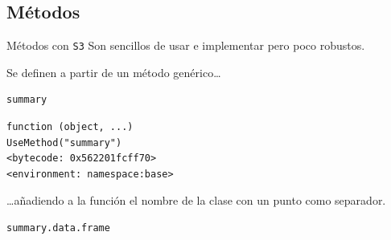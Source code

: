 \documentclass[xcolor={usenames,svgnames,dvipsnames}]{beamer}
\begin{document}
\subsection{Métodos}
\label{sec:org00d2fb7}
\begin{frame}[label={sec:orga0641c5},fragile]{Métodos con \texttt{S3}}
 Son \alert{sencillos} de usar e implementar pero \alert{poco robustos}.

Se definen a partir de un método genérico\ldots{}
\lstset{language=r,label= ,caption= ,captionpos=b,numbers=none}
\begin{lstlisting}
summary
\end{lstlisting}

\begin{verbatim}
function (object, ...) 
UseMethod("summary")
<bytecode: 0x562201fcff70>
<environment: namespace:base>
\end{verbatim}


\ldots{}añadiendo a la función el nombre de la clase con un punto como separador. 
\lstset{language=r,label= ,caption= ,captionpos=b,numbers=none}
\begin{lstlisting}
summary.data.frame
\end{lstlisting}


\end{frame}
\end{document}
